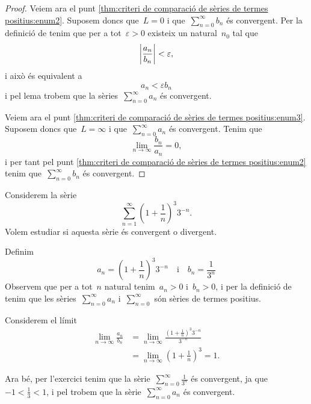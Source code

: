 \documentclass[../../main.tex]{subfiles}
\begin{document}
\begin{theorem}
\begin{proof}
            Veiem ara el punt \eqref{thm:criteri de comparació de sèries de termes positius:enum2}.
            Suposem doncs que~\(L=0\) i que~\(\sum_{n=0}^{\infty}b_{n}\) és convergent.
            Per la definició de  tenim que per a tot~\(\varepsilon>0\) existeix un natural~\(n_{0}\) tal que
            \[
                \abs{\frac{a_{n}}{b_{n}}}<\varepsilon,
            \]
            i això és equivalent a
            \[
                a_{n}<\varepsilon b_{n}
            \]
            i pel lema  trobem que la sèries~\(\sum_{n=0}^{\infty}a_{n}\) és convergent.

            Veiem ara el punt \eqref{thm:criteri de comparació de sèries de termes positius:enum3}.
            Suposem doncs que~\(L=\infty\) i que~\(\sum_{n=0}^{\infty}a_{n}\) és convergent.
            Tenim que
            \[
                \lim_{n\to\infty}\frac{b_{n}}{a_{n}}=0,
            \] %
            i per tant pel punt \eqref{thm:criteri de comparació de sèries de termes positius:enum2} tenim que~\(\sum_{n=0}^{\infty}b_{n}\) és convergent.
        \end{proof}
    \end{theorem}
    \begin{example}
        Considerem la sèrie
        \[
            \sum_{n=1}^{\infty}\left(1+\frac{1}{n}\right)^{3}3^{-n}.
        \]
        Volem estudiar si aquesta sèrie és convergent o divergent.
        \begin{solution}
            Definim
            \[
                a_{n}=\left(1+\frac{1}{n}\right)^{3}3^{-n}\quad\text{i}\quad b_{n}=\frac{1}{3^{n}}
            \]
            Observem que per a tot~\(n\) natural tenim~\(a_{n}>0\) i~\(b_{n}>0\), i per la definició de  tenim que les sèries~\(\sum_{n=0}^{\infty}a_{n}\) i~\(\sum_{n=0}^{\infty}\) són sèries de termes positius.

            Considerem el límit
            \begin{align*}
                \lim_{n\to\infty}\frac{a_{n}}{b_{n}}&=\lim_{n\to\infty}\frac{\left(1+\frac{1}{n}\right)^{3}3^{-n}}{3^{-n}}\\
                &=\lim_{n\to\infty}\left(1+\frac{1}{n}\right)^{3}=1.
            \end{align*}

            Ara bé, per l'exercici  tenim que la sèrie~\(\sum_{n=0}^{\infty}\frac{1}{3^{n}}\) és convergent, ja que~\(-1<\frac{1}{3}<1\), i pel  trobem que la sèrie~\(\sum_{n=0}^{\infty}a_{n}\) és convergent.
        \end{solution}
    \end{example}
\end{document}
